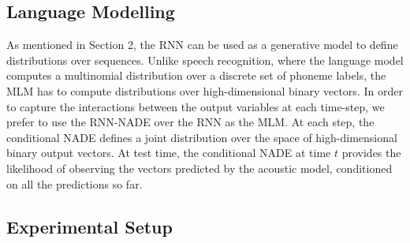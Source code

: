 \documentclass{article}
\begin{document}
\subsection{Language Modelling}

As mentioned in Section 2, the RNN can be used as a generative model to define distributions over sequences. Unlike speech recognition, where the language model computes a multinomial distribution over a discrete set of phoneme labels, the MLM has to compute distributions over high-dimensional binary vectors. In order to capture the interactions between the output variables at each time-step, we prefer to use the RNN-NADE over the RNN as the MLM. At each step, the conditional NADE defines a joint distribution over the space of high-dimensional binary output vectors. At test time, the conditional NADE at time $t$ provides the likelihood of observing the vectors predicted by the acoustic model, conditioned on all the predictions so far.  
\subsection{Experimental Setup}
\end{document}

